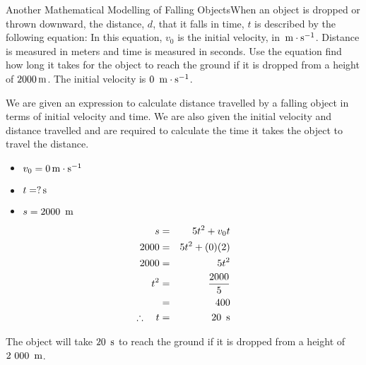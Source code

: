 \begin{wex}{Another Mathematical Modelling of Falling Objects}{When an object is dropped or thrown downward, the distance, $d$, that it falls in time, $t$ is described by the following equation:
In this equation, $v_0$ is the initial velocity, in $\,\mathrm{m \cdot s^{-1}}$. Distance is measured in meters and time is measured in seconds. Use the equation find how long it takes for the object to reach the ground if it is dropped from a height of $2000\,\rm{m}$. The initial velocity is $0~\,\mathrm{m \cdot s^{-1}}$.}
{
We are given an expression to calculate distance travelled by a falling object in terms of initial velocity and time. We are also given the initial velocity and distance travelled and are required to calculate the time it takes the object to travel the distance.

\begin{itemize}
\item $v_0 = 0\,\mathrm{m \cdot s^{-1}}$
\item $t = ?\,\mathrm{s}$
\item $s = 2000~\,\rm{m}$
\end{itemize}

\begin{eqnarray*}
s &=& 5t^2 + v_0t\\
2000&=&5t^2+(0)(2)\\
2000&=&5t^2\\
t^2&=&\frac{2000}{5}\\
&=&400\\
\therefore\quad t&=&20~\,\mathrm{s}
\end{eqnarray*}

The object will take $20~\,\mathrm{s}$ to reach the ground if it is dropped from a height of $2~000~\,\rm{m}$.}
\end{wex}


